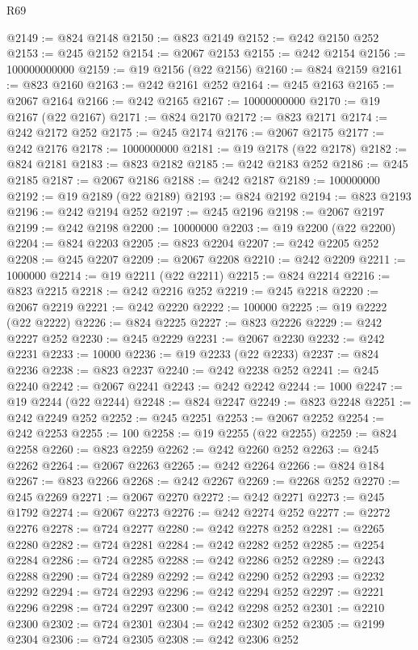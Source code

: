 \begin{lexlean}{R69}
\begin{coremodule}
{@2149 := @824 @2148
@2150 := @823 @2149
@2152 := @242 @2150 @252
@2153 := @245 @2152
@2154 := @2067 @2153
@2155 := @242 @2154
@2156 := 100000000000
@2159 := @19 @2156 (@22 @2156)
@2160 := @824 @2159
@2161 := @823 @2160
@2163 := @242 @2161 @252
@2164 := @245 @2163
@2165 := @2067 @2164
@2166 := @242 @2165
@2167 := 10000000000
@2170 := @19 @2167 (@22 @2167)
@2171 := @824 @2170
@2172 := @823 @2171
@2174 := @242 @2172 @252
@2175 := @245 @2174
@2176 := @2067 @2175
@2177 := @242 @2176
@2178 := 1000000000
@2181 := @19 @2178 (@22 @2178)
@2182 := @824 @2181
@2183 := @823 @2182
@2185 := @242 @2183 @252
@2186 := @245 @2185
@2187 := @2067 @2186
@2188 := @242 @2187
@2189 := 100000000
@2192 := @19 @2189 (@22 @2189)
@2193 := @824 @2192
@2194 := @823 @2193
@2196 := @242 @2194 @252
@2197 := @245 @2196
@2198 := @2067 @2197
@2199 := @242 @2198
@2200 := 10000000
@2203 := @19 @2200 (@22 @2200)
@2204 := @824 @2203
@2205 := @823 @2204
@2207 := @242 @2205 @252
@2208 := @245 @2207
@2209 := @2067 @2208
@2210 := @242 @2209
@2211 := 1000000
@2214 := @19 @2211 (@22 @2211)
@2215 := @824 @2214
@2216 := @823 @2215
@2218 := @242 @2216 @252
@2219 := @245 @2218
@2220 := @2067 @2219
@2221 := @242 @2220
@2222 := 100000
@2225 := @19 @2222 (@22 @2222)
@2226 := @824 @2225
@2227 := @823 @2226
@2229 := @242 @2227 @252
@2230 := @245 @2229
@2231 := @2067 @2230
@2232 := @242 @2231
@2233 := 10000
@2236 := @19 @2233 (@22 @2233)
@2237 := @824 @2236
@2238 := @823 @2237
@2240 := @242 @2238 @252
@2241 := @245 @2240
@2242 := @2067 @2241
@2243 := @242 @2242
@2244 := 1000
@2247 := @19 @2244 (@22 @2244)
@2248 := @824 @2247
@2249 := @823 @2248
@2251 := @242 @2249 @252
@2252 := @245 @2251
@2253 := @2067 @2252
@2254 := @242 @2253
@2255 := 100
@2258 := @19 @2255 (@22 @2255)
@2259 := @824 @2258
@2260 := @823 @2259
@2262 := @242 @2260 @252
@2263 := @245 @2262
@2264 := @2067 @2263
@2265 := @242 @2264
@2266 := @824 @184
@2267 := @823 @2266
@2268 := @242 @2267
@2269 := @2268 @252
@2270 := @245 @2269
@2271 := @2067 @2270
@2272 := @242 @2271
@2273 := @245 @1792
@2274 := @2067 @2273
@2276 := @242 @2274 @252
@2277 := @2272 @2276
@2278 := @724 @2277
@2280 := @242 @2278 @252
@2281 := @2265 @2280
@2282 := @724 @2281
@2284 := @242 @2282 @252
@2285 := @2254 @2284
@2286 := @724 @2285
@2288 := @242 @2286 @252
@2289 := @2243 @2288
@2290 := @724 @2289
@2292 := @242 @2290 @252
@2293 := @2232 @2292
@2294 := @724 @2293
@2296 := @242 @2294 @252
@2297 := @2221 @2296
@2298 := @724 @2297
@2300 := @242 @2298 @252
@2301 := @2210 @2300
@2302 := @724 @2301
@2304 := @242 @2302 @252
@2305 := @2199 @2304
@2306 := @724 @2305
@2308 := @242 @2306 @252
}
\end{coremodule}
\end{lexlean}
